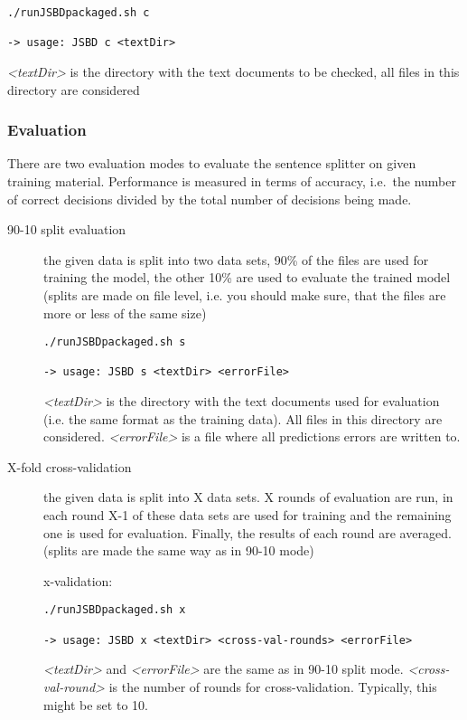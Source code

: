 \documentclass[11pt,a4paper,halfparskip]{scrartcl}
\begin{document}
\begin{verbatim}
./runJSBDpackaged.sh c

-> usage: JSBD c <textDir>
\end{verbatim}

\textit{<textDir>} is the directory with the text documents to be
checked, all files in this directory are considered


\subsubsection{Evaluation}

There are two evaluation modes to evaluate the sentence splitter on
given training material. Performance is measured in terms of accuracy, i.e.\
the number of correct decisions divided by the total number of
decisions being made.

\begin{description}
\item [90-10 split evaluation] the given data is split into two data
  sets, 90\% of the files are used for training the model, the other
  10\% are used to evaluate the trained model (splits are made on file
  level, i.e. you should make sure, that the files are more or less of
  the same size)

\begin{verbatim}
./runJSBDpackaged.sh s

-> usage: JSBD s <textDir> <errorFile>
\end{verbatim}

\textit{<textDir>} is the directory with the text documents used for
evaluation (i.e. the same format as the training data). All files in
this directory are considered. \textit{<errorFile>} is a file where
all predictions errors are written to.


\item[X-fold cross-validation] the given data is split into X data
  sets. X rounds of evaluation are run, in each round X-1 of these data
  sets are used for training and the remaining one is used for
  evaluation. Finally, the results of each round are averaged. (splits
  are made the same way as in 90-10 mode)

x-validation:
\begin{verbatim}
./runJSBDpackaged.sh x

-> usage: JSBD x <textDir> <cross-val-rounds> <errorFile>
\end{verbatim}

\textit{<textDir>} and \textit{<errorFile>} are the same as in 90-10
split mode. \textit{<cross-val-round>} is the number of rounds for
cross-validation. Typically, this might be set to 10.

\end{description}
\end{document}
